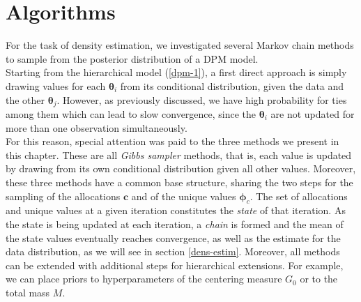 \chapter{Algorithms} \label{algo}
For the task of density estimation, we investigated several Markov chain methods to sample from the posterior distribution of a DPM model. \\
Starting from the hierarchical model (\ref{dpm-1}), a first direct approach is simply drawing values for each $\boldsymbol\theta_i$ from its conditional distribution, given the data and the other $\boldsymbol\theta_j$.
However, as previously discussed, we have high probability for ties among them which can lead to slow convergence, since the $\boldsymbol\theta_i$ are not updated for more than one observation simultaneously. \\
For this reason, special attention was paid to the three methods we present in this chapter.
These are all \emph{Gibbs sampler} methods, that is, each value is updated by drawing from its own conditional distribution given all other values.
Moreover, these three methods have a common base structure, sharing the two steps for the sampling of the allocations $\mathbf{c}$ and of the unique values $\boldsymbol\phi_c$.
The set of allocations and unique values at a given iteration constitutes the \emph{state} of that iteration.
As the state is being updated at each iteration, a \emph{chain} is formed and the mean of the state values eventually reaches convergence, as well as the estimate for the data distribution, as we will see in section \ref{dens-estim}.
Moreover, all methods can be extended with additional steps for hierarchical extensions.
For example, we can place priors to hyperparameters of the centering measure $G_0$ or to the total mass $M$.

